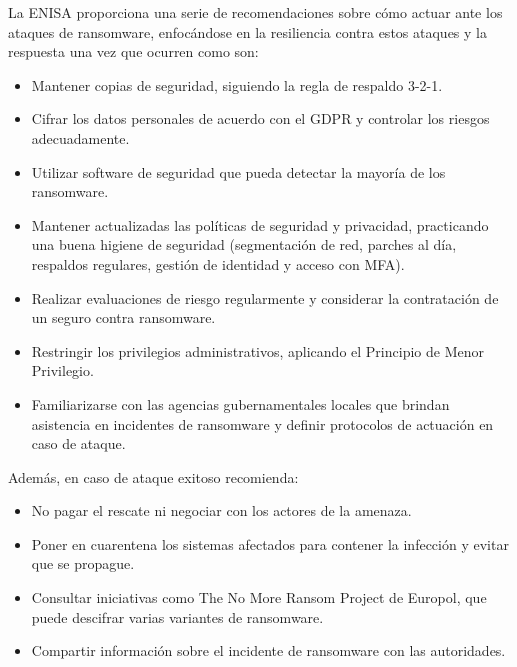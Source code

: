  La ENISA\autocite{enisa2022ransomware} proporciona una serie de recomendaciones sobre cómo actuar ante los ataques de ransomware, enfocándose en la resiliencia contra estos ataques y la respuesta una vez que ocurren como son:

\begin{itemize}
  \item Mantener copias de seguridad, siguiendo la regla de respaldo 3-2-1.
  \item Cifrar los datos personales de acuerdo con el GDPR y controlar los riesgos adecuadamente.
  \item Utilizar software de seguridad que pueda detectar la mayoría de los ransomware.
  \item Mantener actualizadas las políticas de seguridad y privacidad, practicando una buena higiene de seguridad (segmentación de red, parches al día, respaldos regulares, gestión de identidad y acceso con MFA).
  \item Realizar evaluaciones de riesgo regularmente y considerar la contratación de un seguro contra ransomware.
  \item Restringir los privilegios administrativos, aplicando el Principio de Menor Privilegio.
  \item Familiarizarse con las agencias gubernamentales locales que brindan asistencia en incidentes de ransomware y definir protocolos de actuación en caso de ataque.
\end{itemize}

Además, en caso de ataque exitoso recomienda:

\begin{itemize}
  \item No pagar el rescate ni negociar con los actores de la amenaza.
  \item Poner en cuarentena los sistemas afectados para contener la infección y evitar que se propague.
  \item Consultar iniciativas como The No More Ransom Project de Europol, que puede descifrar varias variantes de ransomware.
  \item Compartir información sobre el incidente de ransomware con las autoridades.
\end{itemize}

